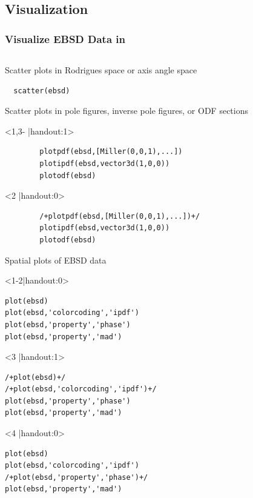 \subsection*{Visualization}

\begin{frame}[fragile]
  \frametitle{Visualize EBSD Data in \MTEX}

  \begin{columns}
    \begin{column}{8.5cm}

Scatter plots in Rodrigues space or axis angle space

\begin{lstlisting}
  scatter(ebsd)
\end{lstlisting}

\pause

Scatter plots in pole figures, inverse pole figures, or ODF sections


\begin{onlyenv}<1,3- |handout:1>
\begin{lstlisting}
		plotpdf(ebsd,[Miller(0,0,1),...])
		plotipdf(ebsd,vector3d(1,0,0))
		plotodf(ebsd)
\end{lstlisting}
\end{onlyenv}

\begin{onlyenv}<2 |handout:0>
\begin{lstlisting}
		/+plotpdf(ebsd,[Miller(0,0,1),...])+/
		plotipdf(ebsd,vector3d(1,0,0))
		plotodf(ebsd)
\end{lstlisting}
\end{onlyenv}

\pause

Spatial plots of EBSD data

\begin{onlyenv}<1-2|handout:0>
\begin{lstlisting}
plot(ebsd)
plot(ebsd,'colorcoding','ipdf')
plot(ebsd,'property','phase')
plot(ebsd,'property','mad')
\end{lstlisting}
\end{onlyenv}

\begin{onlyenv}<3 |handout:1>
\begin{lstlisting}
/+plot(ebsd)+/
/+plot(ebsd,'colorcoding','ipdf')+/
plot(ebsd,'property','phase')
plot(ebsd,'property','mad')
\end{lstlisting}
\end{onlyenv}

\begin{onlyenv}<4 |handout:0>
\begin{lstlisting}
plot(ebsd)
plot(ebsd,'colorcoding','ipdf')
/+plot(ebsd,'property','phase')+/
plot(ebsd,'property','mad')
\end{lstlisting}
\end{onlyenv}


\end{column}
\end{columns}
\end{frame}
